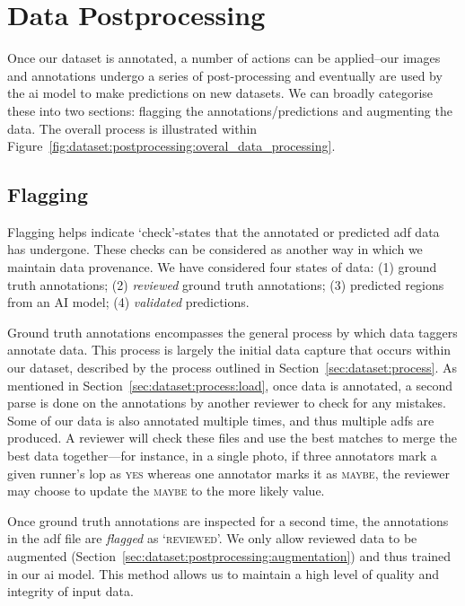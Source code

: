 \section{Data Postprocessing}
\label{sec:dataset:postprocessing}

Once our dataset is annotated, a number of actions can be applied--our images and annotations undergo a series of post-processing and eventually are used by the \gls{ai} model to make predictions on new datasets. We can broadly categorise these into two sections: flagging the annotations/predictions and augmenting the data. The overall process is illustrated within Figure~\ref{fig:dataset:postprocessing:overal_data_processing}.

\subsection{Flagging}
\label{sec:dataset:postprocessing:flagging}

Flagging helps indicate `check'-states that the annotated or predicted \gls{adf} data has undergone. These checks can be considered as another way in which we maintain data provenance. We have considered four states of data: (1) ground truth annotations; (2) \textit{reviewed} ground truth annotations; (3) predicted regions from an AI model; (4) \textit{validated} predictions.

Ground truth annotations encompasses the general process by which data taggers annotate data. This process is largely the initial data capture that occurs within our dataset, described by the process outlined in Section~\ref{sec:dataset:process}. As mentioned in Section~\ref{sec:dataset:process:load}, once data is annotated, a second parse is done on the annotations by another reviewer to check for any mistakes. Some of our data is also annotated multiple times, and thus multiple \glspl{adf} are produced. A reviewer will check these files and use the best matches to merge the best data together---for instance, in a single photo, if three annotators mark a given runner's \gls{lop} as \textsc{yes} whereas one annotator marks it as \textsc{maybe}, the reviewer may choose to update the \textsc{maybe} to the more likely value.

Once ground truth annotations are inspected for a second time, the annotations in the \gls{adf} file are \textit{flagged} as `\textsc{reviewed}'. We only allow reviewed data to be augmented (Section~\ref{sec:dataset:postprocessing:augmentation}) and thus trained in our \gls{ai} model. This method allows us to maintain a high level of quality and integrity of input data.

